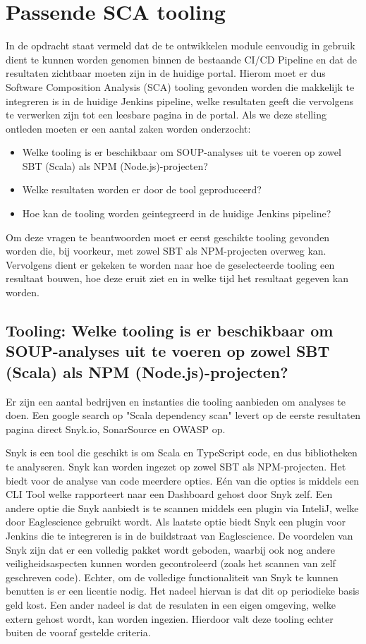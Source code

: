 \section{Passende SCA tooling}\label{sec:sca-tooling}

In de opdracht staat vermeld dat de te ontwikkelen module eenvoudig in gebruik dient te kunnen worden genomen binnen de bestaande CI/CD Pipeline en dat de resultaten zichtbaar moeten zijn in de huidige portal. Hierom moet er dus Software Composition Analysis (SCA) tooling gevonden worden die makkelijk te integreren is in de huidige Jenkins pipeline, welke resultaten geeft die vervolgens te verwerken zijn tot een leesbare pagina in de portal. Als we deze stelling ontleden moeten er een aantal zaken worden onderzocht:
\begin{itemize}
    \item Welke tooling is er beschikbaar om SOUP-analyses uit te voeren op zowel SBT (Scala) als NPM (Node.js)-projecten?
    \item Welke resultaten worden er door de tool geproduceerd?
    \item Hoe kan de tooling worden geintegreerd in de huidige Jenkins pipeline?
\end{itemize}
Om deze vragen te beantwoorden moet er eerst geschikte tooling gevonden worden die, bij voorkeur, met zowel SBT als NPM-projecten overweg kan. Vervolgens dient er gekeken te worden naar hoe de geselecteerde tooling een resultaat bouwen, hoe deze eruit ziet en in welke tijd het resultaat gegeven kan worden.

\subsection{Tooling: Welke tooling is er beschikbaar om SOUP-analyses uit te voeren op zowel SBT (Scala) als NPM (Node.js)-projecten?}\label{subsec:ESTooling}
Er zijn een aantal bedrijven en instanties die tooling aanbieden om analyses te doen. Een google search op "Scala dependency scan" levert op de eerste resultaten pagina direct Snyk.io, SonarSource en OWASP op.

Snyk is een tool die geschikt is om Scala en TypeScript code, en dus bibliotheken te analyseren. Snyk kan worden ingezet op zowel SBT als NPM-projecten. Het biedt voor de analyse van code meerdere opties. Eén van die opties is middels een CLI Tool welke rapporteert naar een Dashboard gehost door Snyk zelf. Een andere optie die Snyk aanbiedt is te scannen middels een plugin via InteliJ, welke door Eaglescience gebruikt wordt. Als laatste optie biedt Snyk een plugin voor Jenkins die te integreren is in de buildstraat van Eaglescience. De voordelen van Snyk zijn dat er een volledig pakket wordt geboden, waarbij ook nog andere veiligheidsaspecten kunnen worden gecontroleerd (zoals het scannen van zelf geschreven code). Echter, om de volledige functionaliteit van Snyk te kunnen benutten is er een licentie nodig. Het nadeel hiervan is dat dit op periodieke basis geld kost. Een ander nadeel is dat de resulaten in een eigen omgeving, welke extern gehost wordt, kan worden ingezien. Hierdoor valt deze tooling echter buiten de vooraf gestelde criteria.

